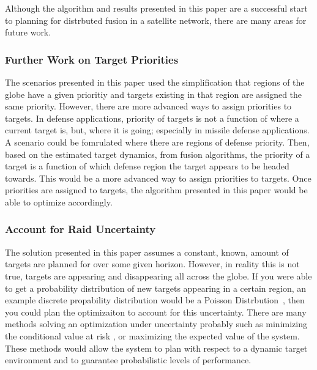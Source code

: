 Although the algorithm and results presented in this paper are a successful start to planning for distrbuted fusion in a satellite network, there are many areas for future work.

\subsubsection{Further Work on Target Priorities}
The scenarios presented in this paper used the simplification that regions of the globe have a given prioritiy and targets existing in that region are assigned the same priority.
However, there are more advanced ways to assign priorities to targets.
In defense applications, priority of targets is not a function of where a current target is, but, where it is going; especially in missile defense applications.
A scenario could be fomrulated where there are regions of defense priority. 
Then, based on the estimated target dynamics, from fusion algorithms, the priority of a target is a function of which defense region the target appears to be headed towards.
This would be a more advanced way to assign priorities to targets. 
Once priorities are assigned to targets, the algorithm presented in this paper would be able to optimize accordingly.


\subsubsection{Account for Raid Uncertainty}
The solution presented in this paper assumes a constant, known, amount of targets are planned for over some given horizon. 
However, in reality this is not true, targets are appearing and disappearing all across the globe.
If you were able to get a probability distribution of new targets appearing in a certain region, an example discrete propability distribution would be a Poisson Distrbution~\cite{b9}, then you could plan the optimizaiton to account for this uncertainty.
There are many methods solving an optimization under uncertainty probably such as minimizing the conditional value at risk \cite{b8}, or maximizing the expected value of the system.
These methods would allow the system to plan with respect to a dynamic target environment and to guarantee probabilistic levels of performance.

